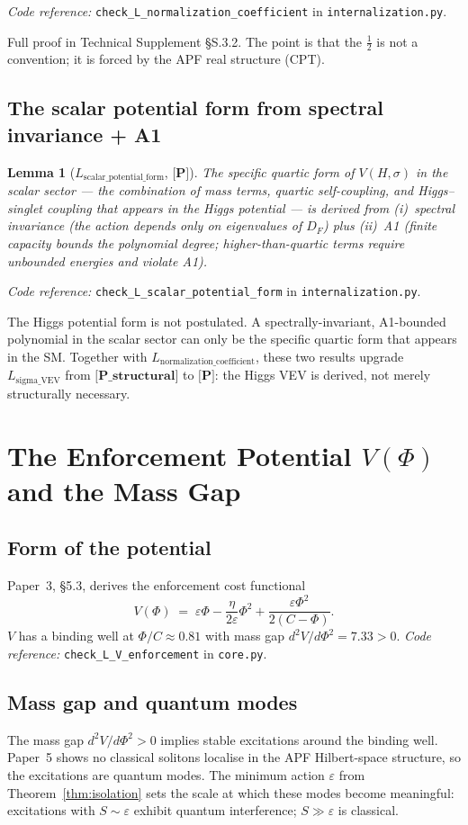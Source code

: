 \documentclass[11pt]{article}
\newcommand{\coderef}[2]{\smallskip\noindent\textit{Code reference:} \texttt{#1} in \texttt{#2}.}
\newcommand{\epitag}[1]{\textbf{[#1]}}
\newtheorem{lemma}[theorem]{Lemma}
\theoremstyle{definition}
\begin{document}
\coderef{check\_L\_normalization\_coefficient}{internalization.py}

Full proof in Technical Supplement \S S.3.2.  The point is that the $\tfrac{1}{2}$ is not a convention; it is forced by the APF real structure (CPT).

\subsection{The scalar potential form from spectral invariance + A1}
\begin{lemma}[$L_{\mathrm{scalar\_potential\_form}}$, $\epitag{P}$]
The specific quartic form of $V(H, \sigma)$ in the scalar sector --- the combination of mass terms, quartic self-coupling, and Higgs--singlet coupling that appears in the Higgs potential --- is derived from (i)~spectral invariance (the action depends only on eigenvalues of $D_F$) plus (ii)~A1 (finite capacity bounds the polynomial degree; higher-than-quartic terms require unbounded energies and violate A1).
\end{lemma}

\coderef{check\_L\_scalar\_potential\_form}{internalization.py}

The Higgs potential form is not postulated.  A spectrally-invariant, A1-bounded polynomial in the scalar sector can only be the specific quartic form that appears in the SM.  Together with $L_{\mathrm{normalization\_coefficient}}$, these two results upgrade $L_{\mathrm{sigma\_VEV}}$ from $\epitag{P\_structural}$ to $\epitag{P}$: the Higgs VEV is derived, not merely structurally necessary.

\section{The Enforcement Potential $V(\Phi)$ and the Mass Gap}\label{sec:V}

\subsection{Form of the potential}
Paper~3, \S 5.3, derives the enforcement cost functional
\[
V(\Phi) \;=\; \varepsilon \Phi - \frac{\eta}{2\varepsilon} \Phi^2 + \frac{\varepsilon \Phi^2}{2(C - \Phi)}.
\]
$V$ has a binding well at $\Phi/C \approx 0.81$ with mass gap $d^2 V/d\Phi^2 = 7.33 > 0$.
\coderef{check\_L\_V\_enforcement}{core.py}

\subsection{Mass gap and quantum modes}
The mass gap $d^2 V / d\Phi^2 > 0$ implies stable excitations around the binding well.  Paper~5 shows no classical solitons localise in the APF Hilbert-space structure, so the excitations are quantum modes.  The minimum action $\varepsilon$ from Theorem~\ref{thm:isolation} sets the scale at which these modes become meaningful: excitations with $S \sim \varepsilon$ exhibit quantum interference; $S \gg \varepsilon$ is classical.
\end{document}

